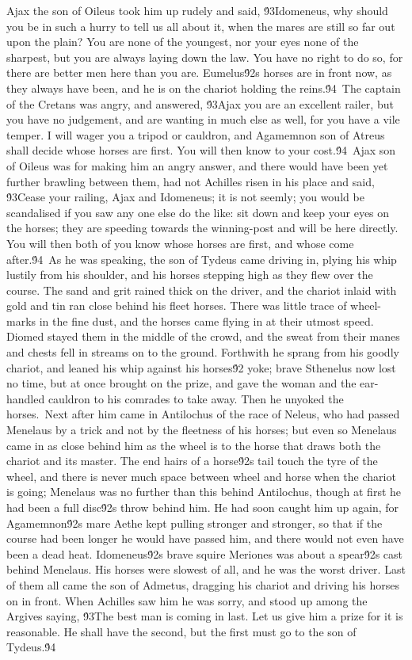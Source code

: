{Ajax the son of Oileus took him up rudely and said, \'93Idomeneus, why should you be in such a hurry to tell us all about it, when the mares are still so far out upon the plain? You are none of the youngest, nor your eyes none of the sharpest, but you are always laying down the law. You have no right to do so, for there are better men here than you are. Eumelus\'92s horses are in front now, as they always have been, and he is on the chariot holding the reins.\'94\
The captain of the Cretans was angry, and answered, \'93Ajax you are an excellent railer, but you have no judgement, and are wanting in much else as well, for you have a vile temper. I will wager you a tripod or cauldron, and Agamemnon son of Atreus shall decide whose horses are first. You will then know to your cost.\'94\
Ajax son of Oileus was for making him an angry answer, and there would have been yet further brawling between them, had not Achilles risen in his place and said, \'93Cease your railing, Ajax and Idomeneus; it is not seemly; you would be scandalised if you saw any one else do the like: sit down and keep your eyes on the horses; they are speeding towards the winning-post and will be here directly. You will then both of you know whose horses are first, and whose come after.\'94\
As he was speaking, the son of Tydeus came driving in, plying his whip lustily from his shoulder, and his horses stepping high as they flew over the course. The sand and grit rained thick on the driver, and the chariot inlaid with gold and tin ran close behind his fleet horses. There was little trace of wheel-marks in the fine dust, and the horses came flying in at their utmost speed. Diomed stayed them in the middle of the crowd, and the sweat from their manes and chests fell in streams on to the ground. Forthwith he sprang from his goodly chariot, and leaned his whip against his horses\'92 yoke; brave Sthenelus now lost no time, but at once brought on the prize, and gave the woman and the ear-handled cauldron to his comrades to take away. Then he unyoked the horses.\
Next after him came in Antilochus of the race of Neleus, who had passed Menelaus by a trick and not by the fleetness of his horses; but even so Menelaus came in as close behind him as the wheel is to the horse that draws both the chariot and its master. The end hairs of a horse\'92s tail touch the tyre of the wheel, and there is never much space between wheel and horse when the chariot is going; Menelaus was no further than this behind Antilochus, though at first he had been a full disc\'92s throw behind him. He had soon caught him up again, for Agamemnon\'92s mare Aethe kept pulling stronger and stronger, so that if the course had been longer he would have passed him, and there would not even have been a dead heat. Idomeneus\'92s brave squire Meriones was about a spear\'92s cast behind Menelaus. His horses were slowest of all, and he was the worst driver. Last of them all came the son of Admetus, dragging his chariot and driving his horses on in front. When Achilles saw him he was sorry, and stood up among the Argives saying, \'93The best man is coming in last. Let us give him a prize for it is reasonable. He shall have the second, but the first must go to the son of Tydeus.\'94\
}
